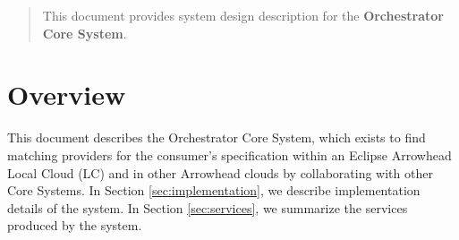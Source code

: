 \documentclass[a4paper]{arrowhead}
\begin{document}
\ArrowheadDate{\today}
\ArrowheadSetup

\begin{center}
  \vspace*{1cm}
  \huge{\arrowtitle}

  \vspace*{0.2cm}
  \LARGE{\arrowtype}
  \vspace*{1cm}

  \vspace*{\fill}


  \vspace*{1cm}
  \vspace*{\fill}

  \begin{abstract}
    This document provides system design description for the \textbf{Orchestrator Core System}.
  \end{abstract}

  \vspace*{1cm}

 \end{center}

\newpage

\tableofcontents
\newpage

\section{Overview}
\label{sec:overview}
\color{black}
This document describes the Orchestrator Core System, which exists to find matching providers for the
consumer’s specification within an Eclipse Arrowhead Local Cloud (LC) and in other Arrowhead clouds by
collaborating with other Core Systems. In Section \ref{sec:implementation}, we describe implementation details of the system. In Section \ref{sec:services}, we summarize the services produced by the system.
\end{document}

